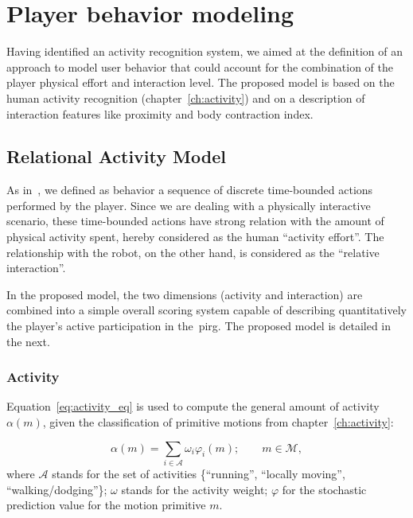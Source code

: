 \chapter{Player behavior modeling}\label{ch:modeling}

Having identified an activity recognition system, we aimed at the definition of an approach to model user behavior that could account for the combination of the player physical effort and interaction level. The proposed model is based on the human activity recognition (chapter~\ref{ch:activity}) and on a description of interaction features like proximity and body contraction index.

\section{Relational Activity Model}\label{sec:simple_model}

As in~\cite{etheredge_generic_2013}, we defined as behavior a sequence of discrete time-bounded actions performed by the player. Since we are dealing with a physically interactive scenario, these time-bounded actions have strong relation with the amount of physical activity spent, hereby considered as the human ``activity effort''. The relationship with the robot, on the other hand, is considered as the ``relative interaction''. 

In the proposed model, the two dimensions (activity and interaction) are combined into a simple overall scoring system capable of describing quantitatively the player's active participation in the~\gls{pirg}. The proposed model is detailed in the next.

\subsection{Activity}\label{activity}

Equation~\ref{eq:activity_eq} is used to compute the general amount of activity $\alpha(m)$, given the classification of primitive motions from chapter~\ref{ch:activity}:

\begin{equation}
	\alpha(m)=\sum_{i \in \mathcal{A}} \omega_{i}\varphi_i(m);\qquad m \in \mathcal{M},
	\label{eq:activity_eq}
\end{equation}
where $\mathcal{A}$ stands for the set of activities \{``running'', ``locally moving'', ``walking/dodging''\}; $\omega$ stands for the activity weight; $\varphi$ for the stochastic prediction value for the motion primitive $m$.

